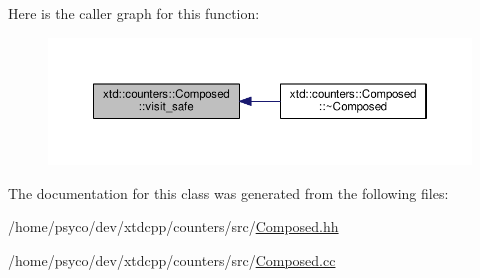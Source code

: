 Here is the caller graph for this function\+:
\nopagebreak
\begin{figure}[H]
\begin{center}
\leavevmode
\includegraphics[width=350pt]{classxtd_1_1counters_1_1Composed_a0ef35ed872c3c19d29e2ecc3fa524474_icgraph}
\end{center}
\end{figure}




The documentation for this class was generated from the following files\+:\begin{DoxyCompactItemize}
\item 
/home/psyco/dev/xtdcpp/counters/src/\hyperlink{Composed_8hh}{Composed.\+hh}\item 
/home/psyco/dev/xtdcpp/counters/src/\hyperlink{Composed_8cc}{Composed.\+cc}\end{DoxyCompactItemize}
